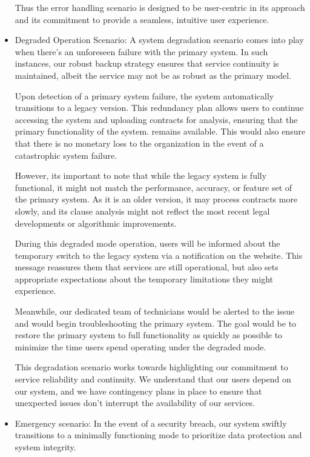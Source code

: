 \begin{itemize}
Thus the error handling scenario is designed to be user-centric in its approach and its commitment to provide a seamless, intuitive user experience. 

 \item Degraded Operation Scenario: A system degradation scenario comes into play when there's an unforeseen failure with the primary system. In such instances, our robust backup strategy ensures that service continuity is maintained, albeit the service may not be as robust as the primary model.

Upon detection of a primary system failure, the system automatically transitions to a legacy version. This redundancy plan allows users to continue accessing the system and uploading contracts for analysis, ensuring that the primary functionality of the system. remains available. This would also ensure that there is no monetary loss to the organization in the event of a catastrophic system failure. 

However, its important to note that while the legacy system is fully functional, it might not match the performance, accuracy, or feature set of the primary system. As it is an older version, it may process contracts more slowly, and its clause analysis might not reflect the most recent legal developments or algorithmic improvements.

During this degraded mode operation, users will be informed about the temporary switch to the legacy system via a notification on the website. This message reassures them that services are still operational, but also sets appropriate expectations about the temporary limitations they might experience.

Meanwhile, our dedicated team of technicians would be alerted to the issue and would begin troubleshooting the primary system. The goal would be to restore the primary system to full functionality as quickly as possible to minimize the time users spend operating under the degraded mode.

This degradation scenario works towards highlighting our commitment to service reliability and continuity. We understand that our users depend on our system, and we have contingency plans in place to ensure that unexpected issues don't interrupt the availability of our services.

    \item Emergency scenario: In the event of a security breach, our system swiftly transitions to a minimally functioning mode to prioritize data protection and system integrity.


\end{itemize}
